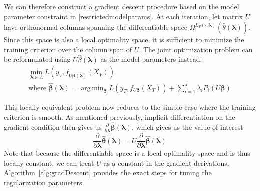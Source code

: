 \documentclass[10pt,letterpaper]{article}
\DeclareMathOperator*{\argmin}{arg\,min}
\begin{document}
We can therefore construct a gradient descent procedure based on the model parameter constraint in \eqref{restrictedmodelparams}. At each iteration, let matrix $U$ have orthonormal columns spanning the differentiable space $\Omega^{L_T(\cdot, \boldsymbol{\lambda})}(\hat \theta(\boldsymbol{\lambda}))$. Since this space is also a local optimality space, it is sufficient to minimize the training criterion over the column span of $U$. The joint optimization problem can be reformulated using $U \hat \beta(\boldsymbol{\lambda})$ as the model parameters instead:
\begin{equation}
\begin{array}{c}
\min_{\boldsymbol \lambda \in \Lambda} L(y_V, f_{U \hat{\boldsymbol \beta} (\boldsymbol \lambda) }(X_V)) \\
\text{where } \hat{\boldsymbol \beta} (\boldsymbol \lambda) =
\argmin_{\boldsymbol \beta}
L(y_T, f_{U \boldsymbol \beta}(X_T))
+ \sum\limits_{i=1}^J \lambda_i P_i( U \boldsymbol \beta)
\end{array}
\end{equation}

This locally equivalent problem now reduces to the simple case where the training criterion is smooth. As mentioned previously, implicit differentiation on the gradient condition then gives us $\frac{\partial}{\partial \boldsymbol \lambda}\hat{\boldsymbol \beta}(\boldsymbol \lambda)$, which gives us the value of interest
\begin{equation}
\frac{\partial}{\partial \boldsymbol \lambda}\hat{\boldsymbol \theta}(\boldsymbol \lambda) = U \frac{\partial}{\partial \boldsymbol \lambda}\hat{\boldsymbol \beta}(\boldsymbol \lambda)
\end{equation}
Note that because the differentiable space is a local optimality space and is thus locally constant, we can treat $U$ as a constant in the gradient derivations. Algorithm~\ref{alg:gradDescent} provides the exact steps for tuning the regularization parameters.
\end{document}
